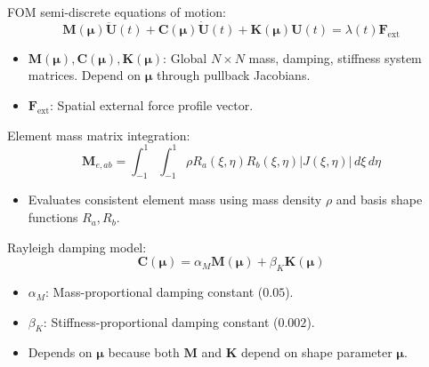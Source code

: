 \documentclass[12pt,a4paper,oneside]{report}
\newcommand{\vect}[1]{\mathbf{#1}}
\newcommand{\mat}[1]{\mathbf{#1}}
\begin{document}
FOM semi-discrete equations of motion:
\begin{equation}
        \mat{M}(\boldsymbol{\mu}) \ddot{\vect{U}}(t) + \mat{C}(\boldsymbol{\mu}) \dot{\vect{U}}(t) + \mat{K}(\boldsymbol{\mu}) \vect{U}(t) = \lambda(t) \mathbf{F}_{\text{ext}}
\end{equation}
\begin{tcolorbox}[colback=gray!5!white,colframe=gray!60!black,title={Term Definitions \& Parameter Dependencies}]
\begin{itemize}
    \item $\mat{M}(\boldsymbol{\mu}), \mat{C}(\boldsymbol{\mu}), \mat{K}(\boldsymbol{\mu})$: Global $N \times N$ mass, damping, stiffness system matrices. Depend on $\boldsymbol{\mu}$ through pullback Jacobians.
    \item $\mathbf{F}_{\text{ext}}$: Spatial external force profile vector.
\end{itemize}
\end{tcolorbox}

Element mass matrix integration:
\begin{equation}
        \mat{M}_{e, ab} = \int_{-1}^{1} \int_{-1}^{1} \rho R_a(\xi, \eta) R_b(\xi, \eta) |J(\xi, \eta)| \, d\xi \, d\eta
\end{equation}
\begin{tcolorbox}[colback=gray!5!white,colframe=gray!60!black,title={Term Definitions \& Parameter Dependencies}]
\begin{itemize}
    \item Evaluates consistent element mass using mass density $\rho$ and basis shape functions $R_a, R_b$.
\end{itemize}
\end{tcolorbox}

Rayleigh damping model:
\begin{equation}
        \mat{C}(\boldsymbol{\mu}) = \alpha_M \mat{M}(\boldsymbol{\mu}) + \beta_K \mat{K}(\boldsymbol{\mu})
\end{equation}
\begin{tcolorbox}[colback=gray!5!white,colframe=gray!60!black,title={Term Definitions \& Parameter Dependencies}]
\begin{itemize}
    \item $\alpha_M$: Mass-proportional damping constant ($0.05$).
    \item $\beta_K$: Stiffness-proportional damping constant ($0.002$).
    \item Depends on $\boldsymbol{\mu}$ because both $\mat{M}$ and $\mat{K}$ depend on shape parameter $\boldsymbol{\mu}$.
\end{itemize}
\end{tcolorbox}
\end{document}
